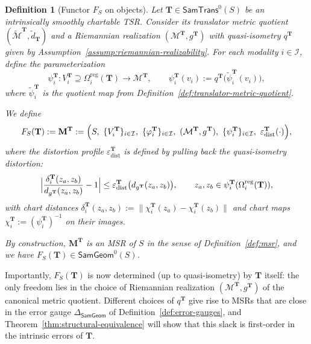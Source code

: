 \documentclass[11pt]{article}
\newtheorem{definition}{Definition}
\newcommand{\SamTrans}{\mathsf{SamTrans}}
\newcommand{\SamGeom}{\mathsf{SamGeom}}
\begin{document}
\begin{definition}[Functor $F_S$ on objects]
\label{def:F-on-objects}
Let $\mathbf{T} \in \SamTrans^0(S)$ be an intrinsically smoothly chartable
TSR.  Consider its translator metric quotient
$(\widetilde{\mathcal{M}}^{\mathbf{T}}, \tilde d_{\mathbf{T}})$ and a
Riemannian realization
$(\mathcal{M}^{\mathbf{T}}, g^{\mathbf{T}})$ with quasi-isometry
$q^{\mathbf{T}}$ given by Assumption~\ref{assump:riemannian-realizability}.
For each modality $i \in \mathcal{I}$, define the parameterization
\[
\psi_i^{\mathbf{T}}
: V_i^{\mathbf{T}} \supseteq \Omega_i^{\mathrm{reg}}(\mathbf{T})
\longrightarrow
\mathcal{M}^{\mathbf{T}},
\qquad
\psi_i^{\mathbf{T}}(v_i)
:=
q^{\mathbf{T}}\bigl(\tilde\psi_i^{\mathbf{T}}(v_i)\bigr),
\]
where $\tilde\psi_i^{\mathbf{T}}$ is the quotient map from
Definition~\ref{def:translator-metric-quotient}.

We define
\[
F_S(\mathbf{T})
:=
\mathbf{M}^{\mathbf{T}}
:=
\Bigl(
  S,\
  \{V_i^{\mathbf{T}}\}_{i\in\mathcal{I}},\
  \{\varphi_i^{\mathbf{T}}\}_{i\in\mathcal{I}},\
  (\mathcal{M}^{\mathbf{T}}, g^{\mathbf{T}}),\
  \{\psi_i^{\mathbf{T}}\}_{i\in\mathcal{I}},\
  \varepsilon_{\mathrm{dist}}^{\mathbf{T}}(\cdot)
\Bigr),
\]
where the distortion profile $\varepsilon_{\mathrm{dist}}^{\mathbf{T}}$ is defined
by pulling back the quasi-isometry distortion:
\[
\Bigl|
  \frac{\delta_i^{\mathbf{T}}(z_a,z_b)}
       {d_{g^{\mathbf{T}}}(z_a,z_b)}
  - 1
\Bigr|
\le
\varepsilon_{\mathrm{dist}}^{\mathbf{T}}\bigl(d_{g^{\mathbf{T}}}(z_a,z_b)\bigr),
\qquad
z_a, z_b \in \psi_i^{\mathbf{T}}(\Omega_i^{\mathrm{reg}}(\mathbf{T})),
\]
with chart distances
$\delta_i^{\mathbf{T}}(z_a,z_b) :=
\|\chi_i^{\mathbf{T}}(z_a) - \chi_i^{\mathbf{T}}(z_b)\|$
and chart maps $\chi_i^{\mathbf{T}} := (\psi_i^{\mathbf{T}})^{-1}$ on their
images.

By construction, $\mathbf{M}^{\mathbf{T}}$ is an MSR of $S$ in the sense
of Definition~\ref{def:msr}, and we have $F_S(\mathbf{T}) \in \SamGeom^0(S)$.
\end{definition}

Importantly, $F_S(\mathbf{T})$ is now determined (up to quasi-isometry) by
$\mathbf{T}$ itself: the only freedom lies in the choice of Riemannian
realization $(\mathcal{M}^{\mathbf{T}}, g^{\mathbf{T}})$ of the canonical
metric quotient.  Different choices of $q^{\mathbf{T}}$ give rise to
MSRs that are close in the error gauge $\Delta_{\SamGeom}$ of
Definition~\ref{def:error-gauges}, and Theorem~\ref{thm:structural-equivalence}
will show that this slack is first-order in the intrinsic errors of
$\mathbf{T}$.
\end{document}
